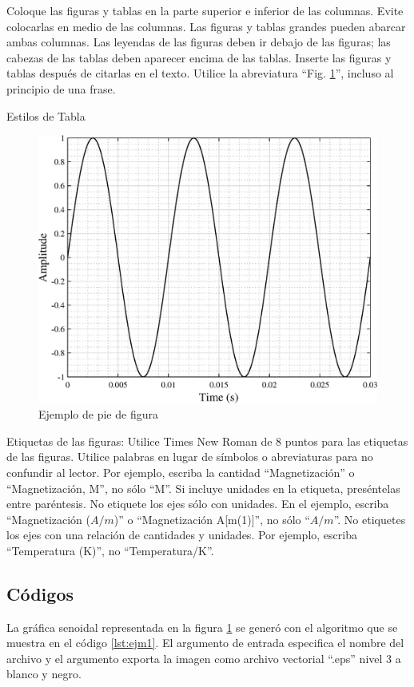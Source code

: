 Coloque las figuras y tablas en la parte superior e inferior de las columnas. Evite colocarlas en medio de las columnas. Las figuras y tablas grandes pueden abarcar ambas columnas. Las leyendas de las figuras deben ir debajo de las figuras; las cabezas de las tablas deben aparecer encima de las tablas. Inserte las figuras y tablas después de citarlas en el texto. Utilice la abreviatura ``Fig. \ref{fig:ejm_fig}'', incluso al principio de una frase.

\begin{table}[!htb]
    \caption{Estilos de Tabla}
    \label{tab:estil_tab}
    \Centering
    
\end{table}

\begin{figure}[!htb]
    \Centering
    \includegraphics[width=0.9\columnwidth]{Figuras/senoide.eps}
    \caption{Ejemplo de pie de figura}
    \label{fig:ejm_fig}
\end{figure}

Etiquetas de las figuras: Utilice Times New Roman de 8 puntos para las etiquetas de las figuras. Utilice palabras en lugar de símbolos o abreviaturas para no confundir al lector. Por ejemplo, escriba la cantidad ``Magnetización'' o ``Magnetización, M'', no sólo ``M''. Si incluye unidades en la etiqueta, preséntelas entre paréntesis. No etiquete los ejes sólo con unidades. En el ejemplo, escriba ``Magnetización ($A/m$)'' o ``Magnetización A[m(1)]'', no sólo ``$A/m$''. No etiquetes los ejes con una relación de cantidades y unidades. Por ejemplo, escriba ``Temperatura (K)'', no ``Temperatura/K''.

\subsection{Códigos} \label{sec:cod_algor}

La gráfica senoidal representada en la figura \ref{fig:ejm_fig} se generó con el algoritmo que se muestra en el código \ref{lst:ejm1}. El argumento de entrada  especifica el nombre del archivo y el argumento  exporta la imagen como archivo vectorial ``.eps'' nivel 3 a blanco y negro.

